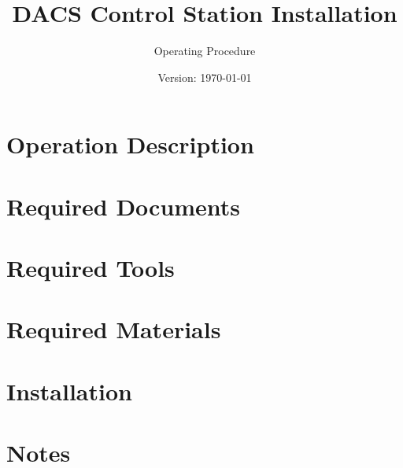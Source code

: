 \documentclass{article}
\title{DACS Control Station Installation}
\author{Operating Procedure}
\date{Version: \isodate\today}
\begin{document}
\maketitle

\thispagestyle{fancy}

\renewcommand{\thesection}{\Alph{section}}

\section{Operation Description}


\section{Required Documents}


\section{Required Tools}


\section{Required Materials}


\newpage

\renewcommand{\thesection}{\arabic{section}}

\setcounter{section}{0}

\section{Installation}


\newpage

\setcounter{section}{0}
\section*{Notes}

\end{document}
